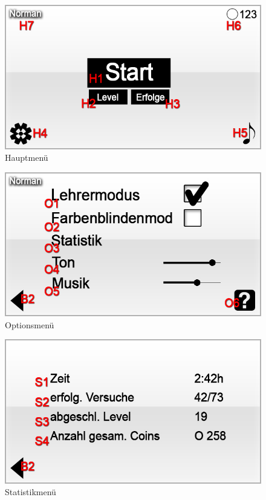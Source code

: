 \begin{figure}[H]
\centering
\includegraphics[scale=0.55]{../gui/_jpeg_numeration/main_manu.jpg}
\caption{Hauptmenü}
\label{fig:Hauptmenu}
\end{figure}

\begin{figure}[H]
\centering
\includegraphics[scale=0.55]{../gui/_jpeg_numeration/settings.jpg}
\caption{Optionsmenü}
\label{fig:Optionsmenu}
\end{figure}

\begin{figure}[H]
\centering
\includegraphics[scale=0.55]{../gui/_jpeg_numeration/stat.jpg}
\caption{Statistikmenü}
\label{fig:Statistikmenu}
\end{figure}

